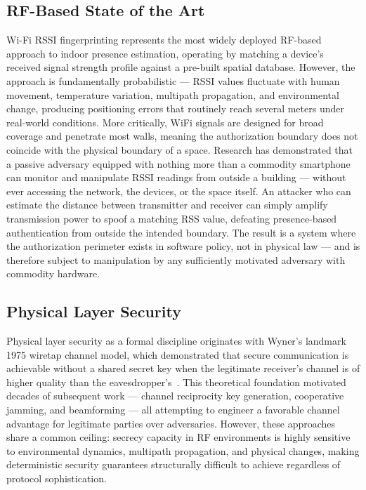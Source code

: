 \documentclass[conference]{IEEEtran}
\begin{document}
\subsection{RF-Based State of the Art}

Wi-Fi RSSI fingerprinting represents the most widely deployed RF-based approach to indoor presence estimation, operating by matching a device's received signal strength profile against a pre-built spatial database. However, the approach is fundamentally probabilistic — RSSI values fluctuate with human movement, temperature variation, multipath propagation, and environmental change, producing positioning errors that routinely reach several meters under real-world conditions. More critically, WiFi signals are designed for broad coverage and penetrate most walls, meaning the authorization boundary does not coincide with the physical boundary of a space. Research has demonstrated that a passive adversary equipped with nothing more than a commodity smartphone can monitor and manipulate RSSI readings from outside a building — without ever accessing the network, the devices, or the space itself. An attacker who can estimate the distance between transmitter and receiver can simply amplify transmission power to spoof a matching RSS value, defeating presence-based authentication from outside the intended boundary. The result is a system where the authorization perimeter exists in software policy, not in physical law — and is therefore subject to manipulation by any sufficiently motivated adversary with commodity hardware.

\subsection{Physical Layer Security}

Physical layer security as a formal discipline originates with Wyner's landmark 1975 wiretap channel model, which demonstrated that secure communication is achievable without a shared secret key when the legitimate receiver's channel is of higher quality than the eavesdropper's~\cite{wyner1975}. This theoretical foundation motivated decades of subsequent work — channel reciprocity key generation, cooperative jamming, and beamforming — all attempting to engineer a favorable channel advantage for legitimate parties over adversaries. However, these approaches share a common ceiling: secrecy capacity in RF environments is highly sensitive to environmental dynamics, multipath propagation, and physical changes, making deterministic security guarantees structurally difficult to achieve regardless of protocol sophistication.
\end{document}
